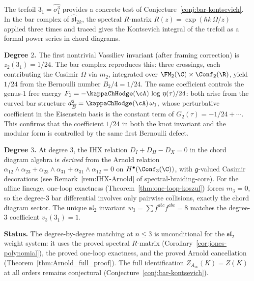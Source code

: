 \begin{example}
\label{ex:trefoil-verification}
The trefoil $3_1 = \widehat{\sigma_1^3}$ provides a
concrete test of Conjecture~\ref{conj:bar-kontsevich}.
In the bar complex of $\widehat{\mathfrak{sl}}_2{}_k$,
the spectral $R$-matrix
$R(z) = \exp(\hbar k\,\Omega/z)$
applied three times and traced gives the
Kontsevich integral of the trefoil as a formal
power series in chord diagrams.

\medskip
\noindent\textbf{Degree $2$.}
The first nontrivial Vassiliev invariant (after framing
correction) is $z_2(3_1) = 1/24$. The bar complex
reproduces this: three crossings, each contributing the
Casimir $\Omega$ via $m_2$, integrated over
$\FM_2(\C) \times \Conf_2(\R)$, yield $1/24$ from
the Bernoulli number $B_2/4 = 1/24$. The same coefficient
controls the genus-$1$ free energy
$F_1 = -\kappaChHodge(\cA)\,\log\,\eta(\tau)/24$:
both arise from the curved bar structure
$d_{\overline{B}}^2 = \kappaChHodge(\cA)\,\omega_1$,
whose perturbative coefficient in the Eisenstein basis is
the constant term of $G_2(\tau) = -1/24 + \cdots$.
This confirms that the coefficient $1/24$ in both the
knot invariant and the modular form is controlled by the
same first Bernoulli defect.

\medskip
\noindent\textbf{Degree $3$.}
At degree $3$, the IHX relation
$D_I + D_H - D_X = 0$ in the chord diagram algebra
is \emph{derived} from the Arnold relation
$\alpha_{12} \wedge \alpha_{23}
+ \alpha_{23} \wedge \alpha_{31}
+ \alpha_{31} \wedge \alpha_{12} = 0$
on $H^\bullet(\Conf_3(\C))$, with $\mathfrak{g}$-valued
Casimir decorations (see Remark~\ref{rem:IHX-Arnold} of
spectral-braiding-core). For the affine lineage,
one-loop exactness (Theorem~\ref{thm:one-loop-koszul})
forces $m_3 = 0$, so the degree-$3$ bar differential
involves only pairwise collisions, exactly the chord
diagram sector. The unique $\mathfrak{sl}_2$ invariant
$w_3 = \sum f^{abc}f^{abc} = 8$ matches the degree-$3$
coefficient $v_3(3_1) = 1$.

\medskip
\noindent\textbf{Status.}
The degree-by-degree matching at $n \le 3$ is unconditional
for the $\mathfrak{sl}_2$ weight system: it uses the proved
spectral $R$-matrix
(Corollary~\ref{cor:jones-polynomial}), the proved one-loop
exactness, and the proved Arnold cancellation
(Theorem~\ref{thm:Arnold_full_proof}). The full
identification $Z_{A_\infty}(K) = Z(K)$ at all orders
remains conjectural (Conjecture~\ref{conj:bar-kontsevich}).
\end{example}

